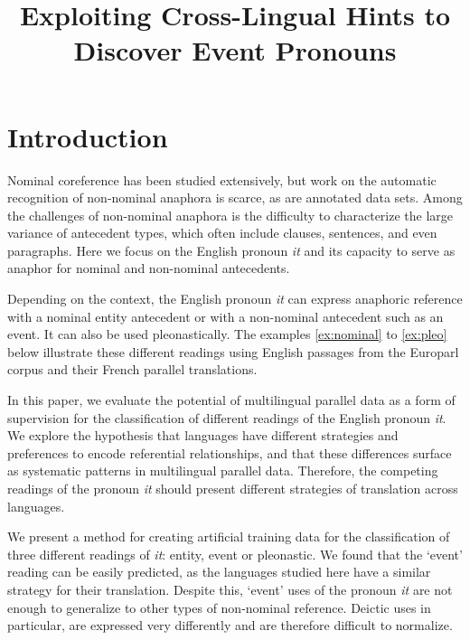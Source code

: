 \documentclass[10pt, a4paper]{article}
\title{Exploiting Cross-Lingual Hints to Discover Event Pronouns}
\begin{document}
\maketitleabstract

\section{Introduction}

\renewcommand{\thefootnote}{\fnsymbol{footnote}}


Nominal coreference has been studied extensively, but work on the automatic 
recognition of non-nominal anaphora is scarce, as are annotated data sets. Among 
the challenges of non-nominal anaphora is the difficulty to characterize the 
large variance of antecedent types, which often include clauses, sentences, and 
even paragraphs. Here we focus on the English pronoun \textit{it} and its 
capacity to serve as anaphor for nominal and non-nominal antecedents. 

Depending on the context, the English pronoun \textit{it} can express anaphoric 
reference with a nominal entity antecedent or with a
non-nominal antecedent such as an event. It can also be used
pleonastically. The examples \ref{ex:nominal} to \ref{ex:pleo} below illustrate
these different readings using English passages from the Europarl corpus and
their French parallel translations. 

In this paper, we evaluate the potential of multilingual parallel data as a 
form of supervision for the classification of different readings of the English 
pronoun \textit{it}. We explore the hypothesis that languages have different strategies 
and preferences to encode referential relationships, and that these differences 
surface as systematic patterns in multilingual parallel data. Therefore, the 
competing readings of the pronoun \textit{it} should present different strategies of 
translation across languages.  

We present a method for creating artificial training data for the classification 
of three different readings of \textit{it}: entity, event or pleonastic. 
We found that the `event' reading can be easily
predicted, as the languages studied here have a similar strategy for their translation. 
Despite this, `event' uses of the pronoun \textit{it} are not enough to generalize to
other types of non-nominal reference. Deictic uses in particular, are expressed
very differently and are therefore difficult to normalize.
\end{document}
